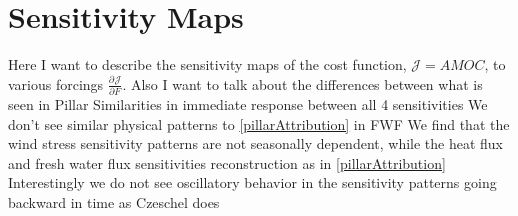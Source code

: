 \documentclass[a4paper,11pt]{article}
\newcommand{\pderiv}[3][]{%
  \ensuremath{\frac{\partial^{#1} {#2}}{\partial {#3}^{#1}}}}
\begin{document}
 \section{Sensitivity Maps}
 \label{sensitivityMaps}
  
  Here I want to describe the sensitivity maps of the cost function, $\mathcal{J} = AMOC$, to various forcings $\pderiv{\mathcal{J}}{F}$. 
  Also I want to talk about the differences between what is seen in Pillar 
  Similarities in immediate response between all 4 sensitivities 
	  We don't see similar physical patterns to \ref{pillarAttribution} in FWF
	  We find that the wind stress sensitivity patterns are not seasonally dependent, while the heat flux and fresh water flux sensitivities  reconstruction as in \ref{pillarAttribution}
	  Interestingly we do not see oscillatory behavior in the sensitivity patterns going backward in time as Czeschel does
  
\end{document}
